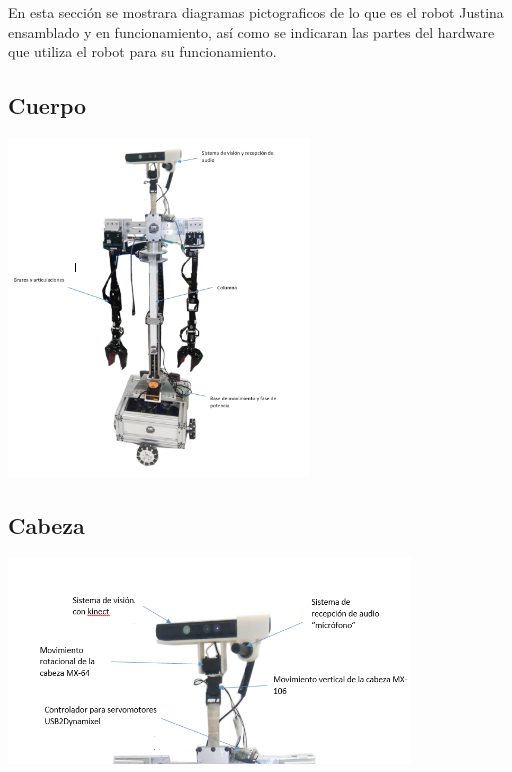 \documentclass[a4paper]{book}
\begin{document}
En esta sección se mostrara diagramas pictograficos de lo que es el robot Justina ensamblado y en funcionamiento, así como se indicaran las partes del hardware que utiliza el robot para su funcionamiento.
\subsection{Cuerpo}

\begin{center}
\includegraphics[width=0.6\textwidth]{Figures/Hardware/Diagramas/Cuerpo.png}
\label{fig:Hardware:Diagramas:Justina:Completa}
\end{center}

\subsection{Cabeza}
\begin{center}
\includegraphics[width=0.8\textwidth]{Figures/Hardware/Diagramas/Cabeza.png}
\label{fig:Hardware:Diagramas:Imagen:Cabeza}
\end{center}
\end{document}
